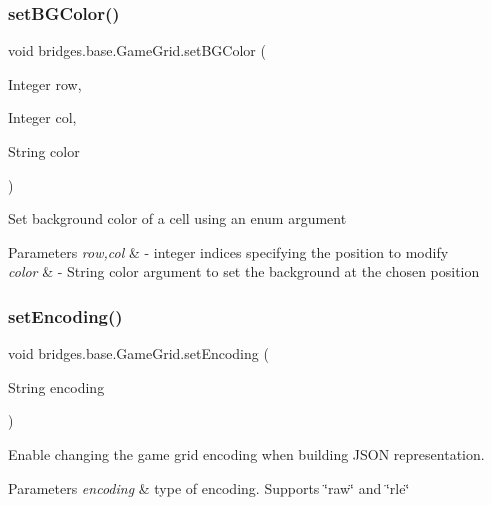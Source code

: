 \subsubsection{\texorpdfstring{set\+B\+G\+Color()}{setBGColor()}\hspace{0.1cm}{\footnotesize\ttfamily [2/2]}}
{\footnotesize\ttfamily void bridges.\+base.\+Game\+Grid.\+set\+B\+G\+Color (\begin{DoxyParamCaption}\item[{Integer}]{row,  }\item[{Integer}]{col,  }\item[{String}]{color }\end{DoxyParamCaption})}

Set background color of a cell using an enum argument


\begin{DoxyParams}{Parameters}
{\em row,col} & -\/ integer indices specifying the position to modify \\
\hline
{\em color} & -\/ String color argument to set the background at the chosen position \\
\hline
\end{DoxyParams}
\mbox{\label{classbridges_1_1base_1_1_game_grid_a2281cfd7d61dc9903c9b1358c9767a1e}} 
\subsubsection{\texorpdfstring{set\+Encoding()}{setEncoding()}}
{\footnotesize\ttfamily void bridges.\+base.\+Game\+Grid.\+set\+Encoding (\begin{DoxyParamCaption}\item[{String}]{encoding }\end{DoxyParamCaption})}



Enable changing the game grid encoding when building J\+S\+ON representation. 


\begin{DoxyParams}{Parameters}
{\em encoding} & type of encoding. Supports \char`\"{}raw\char`\"{} and \char`\"{}rle\char`\"{} \\
\hline
\end{DoxyParams}
\mbox{\label{classbridges_1_1base_1_1_game_grid_a105b46f68bcc9413889e7255318bab4c}} 

